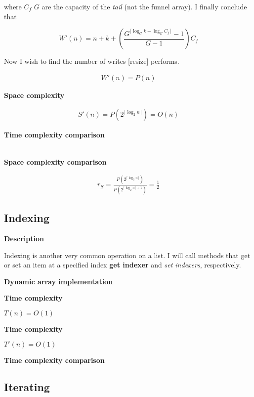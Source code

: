 \documentclass{article}
\newcommand{\descriptn}{\textbf{Description}}
\newcommand{\dynarrayimpl}{\textbf{Dynamic array implementation}}
\newcommand{\tcomplex}{\textbf{Time complexity}}
\newcommand{\scomplex}{\textbf{Space complexity}}
\newcommand{\tcomplexcmp}{\textbf{Time complexity comparison}}
\newcommand{\scomplexcmp}{\textbf{Space complexity comparison}}
\newcommand{\timefn}{T}
\newcommand{\spacefn}{S}
\newcommand{\nwritesfn}{W}
\newcommand{\timenewfn}{\timefn'}
\newcommand{\spacenewfn}{\spacefn'}
\newcommand{\nwritesnewfn}{\nwritesfn'}
\newcommand{\spaceratio}{r_\spacefn}
\newcommand{\bigo}{O}
\newcommand{\biggo}{P}
\newcommand{\varnitems}{n}
\newcommand{\initcapacity}{C_f}
\newcommand{\growthfactor}{G}
\begin{document}
	where $\initcapacity$ $\growthfactor$ are the capacity of the \textit{tail} (not the funnel array). I finally conclude that
	
	$$
	\nwritesnewfn(n) = n + k + \left( \frac{\growthfactor^{\lceil \log_{\growthfactor} k - \log_{\growthfactor} \initcapacity \rceil} - 1}{\growthfactor - 1} \right) \initcapacity
	$$
	
	Now I wish to find the number of writes [resize] performs. 
	
	\begin{align*}
	\nwritesnewfn(\varnitems) = \biggo(\varnitems)
	\end{align*}
	
	\scomplex
	
	\begin{align*}
	\spacenewfn(\varnitems) = \biggo(2^{\lceil \log_2 \varnitems \rceil}) = \bigo(\varnitems)
	\end{align*}
	
	\tcomplexcmp
	
	\begin{align*}
	\end{align*}
	
	\scomplexcmp
	
	\begin{align*}
	\spaceratio = \frac {\biggo(2^{\lceil \log_2 \varnitems \rceil})} {\biggo(2^{\lceil \log_2 \varnitems \rceil + 1})} = \frac{1}{2}
	\end{align*}
	
	\subsection{Indexing}
	
	\descriptn
	
	Indexing is another very common operation on a list. I will call methods that get or set an item at a specified index \textbf{get indexer} and \textit{set indexers}, respectively.
	
	\dynarrayimpl
	
	\tcomplex
	
	$\timefn(\varnitems) = \bigo(1)$
	
	
	\tcomplex
	
	$\timenewfn(\varnitems) = \bigo(1)$
	
	\tcomplexcmp
	
	\subsection{Iterating}
	
\end{document}
